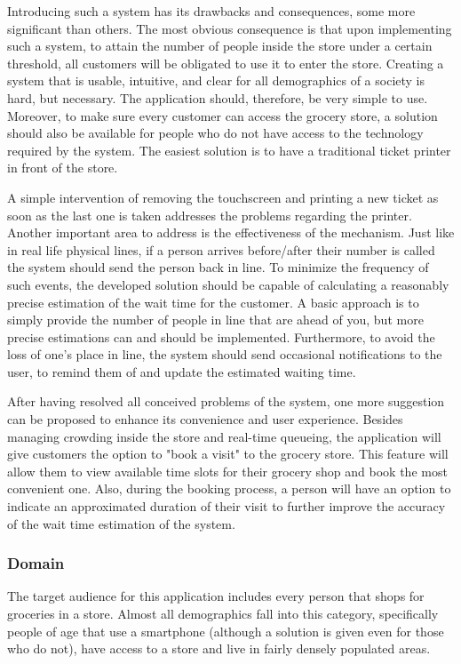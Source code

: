 Introducing such a system has its drawbacks and consequences, some more significant than others. The most obvious consequence is that upon implementing such a system, to attain the number of people inside the store under a certain threshold, all customers will be obligated to use it to enter the store. Creating a system that is usable, intuitive, and clear for all demographics of a society is hard, but necessary. The application should, therefore, be very simple to use. Moreover, to make sure every customer can access the grocery store, a solution should also be available for people who do not have access to the technology required by the system. The easiest solution is to have a traditional ticket printer in front of the store. 

A simple intervention of removing the touchscreen and printing a new ticket as soon as the last one is taken addresses the problems regarding the printer. Another important area to address is the effectiveness of the mechanism. Just like in real life physical lines, if a person arrives before/after their number is called the system should send the person back in line. To minimize the frequency of such events, the developed solution should be capable of calculating a reasonably precise estimation of the wait time for the customer. A basic approach is to simply provide the number of people in line that are ahead of you, but more precise estimations can and should be implemented. Furthermore, to avoid the loss of one’s place in line, the system should send occasional notifications to the user, to remind them of and update the estimated waiting time. 

After having resolved all conceived problems of the system, one more suggestion can be proposed to enhance its convenience and user experience. Besides managing crowding inside the store and real-time queueing, the application will give customers the option to "book a visit" to the grocery store. This feature will allow them to view available time slots for their grocery shop and book the most convenient one. Also, during the booking process, a person will have an option to indicate an approximated duration of their visit to further improve the accuracy of the wait time estimation of the system. 
\subsubsection{Domain}
\hspace{\parindent}The target audience for this application includes every person that shops for groceries in a store. Almost all demographics fall into this category, specifically people of age that use a smartphone (although a solution is given even for those who do not), have access to a store and live in fairly densely populated areas.
  
